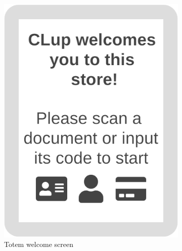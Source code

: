 \begin{figure}[h!]
	\centering
	\begin{subfigure}[b]{0.3\textwidth}
		\includegraphics[width=\linewidth]{../Diagrams/WireframesCLup/TotemStart.png}
		\caption{Totem welcome screen}
		\label{fig:WfTotemStart}
	\end{subfigure}
	\hfill
	\begin{subfigure}[b]{0.3\textwidth}

\end{subfigure}
\end{figure}
